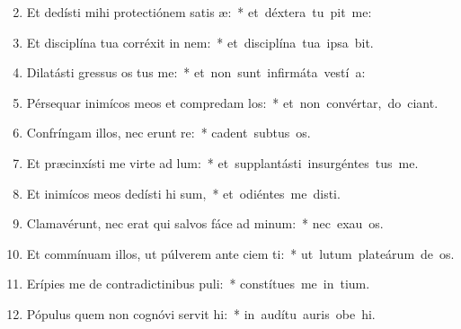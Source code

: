 \begin{flushleft}
\begin{enumerate}[leftmargin=*]
\setcounter{enumi}{1}

\item Et dedísti mihi protectiónem satis æ:~* \mbox{et déxtera tu pit me:}

\item Et disciplína tua corréxit  in nem:~* \mbox{et disciplína tua ipsa  bit.}

\item Dilatásti gressus os tus me:~* \mbox{et non sunt infirmáta vestí a:}

\item Pérsequar inimícos meos et compredam los:~* \mbox{et non convértar, do ciant.}

\item Confríngam illos, nec erunt re:~* \mbox{cadent subtus  os.}

\item Et præcinxísti me virte ad lum:~* \mbox{et supplantásti insurgéntes   tus me.}

\item Et inimícos meos dedísti hi sum,~* \mbox{et odiéntes me disti.}

\item Clamavérunt, nec erat qui salvos fáce ad minum:~* \mbox{nec exau os.}

\item Et commínuam illos, ut púlverem ante ciem ti:~* \mbox{ut lutum plateárum de os.}

\item Erípies me de contradictinibus puli:~* \mbox{constítues me in  tium.}

\item Pópulus quem non cognóvi servit hi:~* \mbox{in audítu auris obe hi.}


\end{enumerate}
\end{flushleft}
